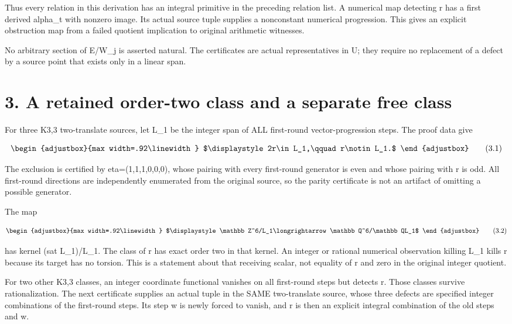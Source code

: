 Thus every relation in this derivation has an integral primitive in the preceding relation list. A numerical map detecting r has a first derived alpha\_t with nonzero image. Its actual source tuple supplies a nonconstant numerical progression. This gives an explicit obstruction map from a failed quotient implication to original arithmetic witnesses.

No arbitrary section of E/W\_j is asserted natural. The certificates are actual representatives in U; they require no replacement of a defect by a source point that exists only in a linear span.

\section{3. A retained order-two class and a separate free class}\label{n19-a-retained-order-two-class-and-a-separate-free-class}

For three K3,3 two-translate sources, let L\_1 be the integer span of ALL first-round vector-progression steps. The proof data give

\[
\begin{adjustbox}{max width=.92\linewidth}
$\displaystyle 2r\in L_1,\qquad r\notin L_1.$
\end{adjustbox}
\tag{3.1}
\]

The exclusion is certified by eta=(1,1,1,0,0,0), whose pairing with every first-round generator is even and whose pairing with r is odd. All first-round directions are independently enumerated from the original source, so the parity certificate is not an artifact of omitting a possible generator.

The map

\[
\begin{adjustbox}{max width=.92\linewidth}
$\displaystyle \mathbb Z^6/L_1\longrightarrow
\mathbb Q^6/\mathbb QL_1$
\end{adjustbox}
\tag{3.2}
\]

has kernel (sat L\_1)/L\_1. The class of r has exact order two in that kernel. An integer or rational numerical observation killing L\_1 kills r because its target has no torsion. This is a statement about that receiving scalar, not equality of r and zero in the original integer quotient.

For two other K3,3 classes, an integer coordinate functional vanishes on all first-round steps but detects r. Those classes survive rationalization. The next certificate supplies an actual tuple in the SAME two-translate source, whose three defects are specified integer combinations of the first-round steps. Its step w is newly forced to vanish, and r is then an explicit integral combination of the old steps and w.

